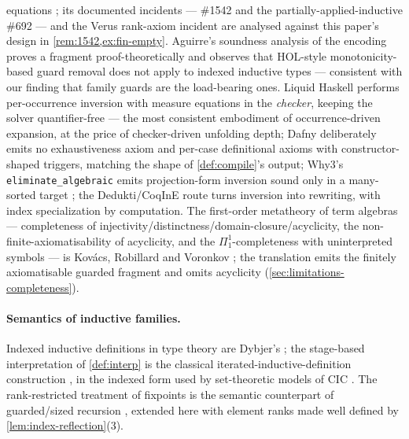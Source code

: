 equations \cite{FStarBook,Aguirre2016}; its documented incidents ---
\#1542 \cite{FStar1542} and the partially-applied-inductive \#692 ---
and the Verus rank-axiom incident \cite{Verus1366} are analysed against
this paper's design in \cref{rem:1542,ex:fin-empty}.  Aguirre's
soundness analysis of the \fstar{} encoding \cite{Aguirre2016} proves a
fragment proof-theoretically and observes that HOL-style
monotonicity-based guard removal does not apply to indexed inductive
types --- consistent with our finding that family guards are the
load-bearing ones.  Liquid Haskell \cite{VazouEtAl2014} performs
per-occurrence inversion with measure equations in the \emph{checker},
keeping the solver quantifier-free --- the most consistent embodiment of
occurrence-driven expansion, at the price of checker-driven unfolding
depth; Dafny \cite{Leino2010} deliberately emits no exhaustiveness
axiom and per-case definitional axioms with constructor-shaped
triggers, matching the shape of \cref{def:compile}'s output; Why3's
\texttt{eliminate\_algebraic} emits projection-form inversion sound
only in a many-sorted target \cite{FilliatrePaskevich2013}; the
Dedukti/CoqInE route \cite{BoespflugBurel2012} turns inversion into
rewriting, with index specialization by computation.  The first-order
metatheory of term algebras --- completeness of
injectivity/distinctness/domain-closure/acyclicity, the
non-finite-axiomatisability of acyclicity, and the
$\Pi^1_1$-completeness with uninterpreted symbols --- is Kov\'acs,
Robillard and Voronkov \cite{KovacsEtAl2017}; the translation emits the
finitely axiomatisable guarded fragment and omits acyclicity
(\cref{sec:limitations-completeness}).

\paragraph{Semantics of inductive families.}  Indexed inductive
definitions in type theory are Dybjer's \cite{Dybjer1994}; the
stage-based interpretation of \cref{def:interp} is the classical
iterated-inductive-definition construction \cite{Aczel1977}, in the
indexed form used by set-theoretic models of CIC
\cite{Werner1997,LeeWerner2011}.  The rank-restricted treatment of
fixpoints is the semantic counterpart of guarded/sized recursion
\cite{Gimenez1995,BartheEtAl2004}, extended here with element ranks
made well defined by \cref{lem:index-reflection}(3).
